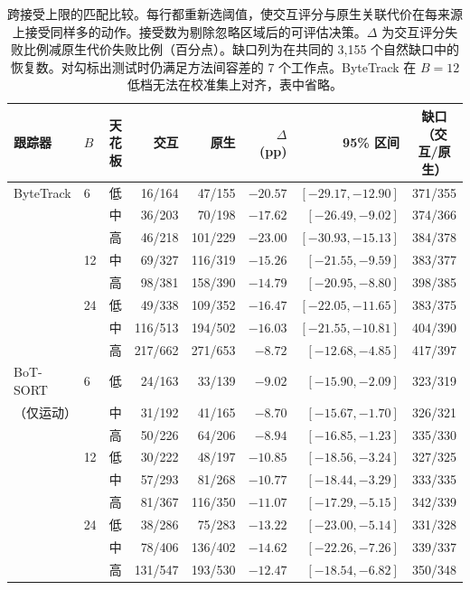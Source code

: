 \begin{table}[t]
\centering
\small
\caption{跨接受上限的匹配比较。每行都重新选阈值，使交互评分与原生关联代价在每来源上接受同样多的动作。接受数为剔除忽略区域后的可评估决策。$\Delta$ 为交互评分失败比例减原生代价失败比例（百分点）。缺口列为在共同的 3,155 个自然缺口中的恢复数。对勾标出测试时仍满足方法间容差的 7 个工作点。ByteTrack 在 $B=12$ 低档无法在校准集上对齐，表中省略。}
\label{tab:caps-zh}
\begin{tabular}{llrrrrrc}
\hline
跟踪器 & $B$ & 天花板 & 交互 & 原生 & $\Delta$ (pp) & 95\% 区间 & 缺口（交互/原生） \\
\hline
ByteTrack & 6 & 低 & 16/164 & 47/155 & $-20.57$ & $[-29.17,-12.90]$ & 371/355 \\
 & & 中 & 36/203 & 70/198 & $-17.62$ & $[-26.49,-9.02]$ & 374/366 \\
 & & 高 & 46/218 & 101/229 & $-23.00$ & $[-30.93,-15.13]$ & 384/378 \\
 & 12 & 中 & 69/327 & 116/319 & $-15.26$ & $[-21.55,-9.59]$ & 383/377 \\
 & & 高 & 98/381 & 158/390 & $-14.79$ & $[-20.95,-8.80]$ & 398/385 \\
 & 24 & 低 & 49/338 & 109/352 & $-16.47$ & $[-22.05,-11.65]$ & 383/375 \\
 & & 中 & 116/513 & 194/502 & $-16.03$ & $[-21.55,-10.81]$ & 404/390 \\
 & & 高 & 217/662 & 271/653 & $-8.72$ & $[-12.68,-4.85]$ & 417/397 \\
\hline
BoT-SORT & 6 & 低 & 24/163 & 33/139 & $-9.02$ & $[-15.90,-2.09]$ & 323/319 \\
（仅运动） & & 中 & 31/192 & 41/165 & $-8.70$ & $[-15.67,-1.70]$ & 326/321 \\
 & & 高 & 50/226 & 64/206 & $-8.94$ & $[-16.85,-1.23]$ & 335/330 \\
 & 12 & 低 & 30/222 & 48/197 & $-10.85$ & $[-18.56,-3.24]$ & 327/325 \\
 & & 中 & 57/293 & 81/268 & $-10.77$ & $[-18.44,-3.29]$ & 333/335 \\
 & & 高 & 81/367 & 116/350 & $-11.07$ & $[-17.29,-5.15]$ & 342/339 \\
 & 24 & 低 & 38/286 & 75/283 & $-13.22$ & $[-23.00,-5.14]$ & 331/328 \\
 & & 中 & 78/406 & 136/402 & $-14.62$ & $[-22.26,-7.26]$ & 339/337 \\
 & & 高 & 131/547 & 193/530 & $-12.47$ & $[-18.54,-6.82]$ & 350/348 \\
\hline
\end{tabular}
\end{table}

